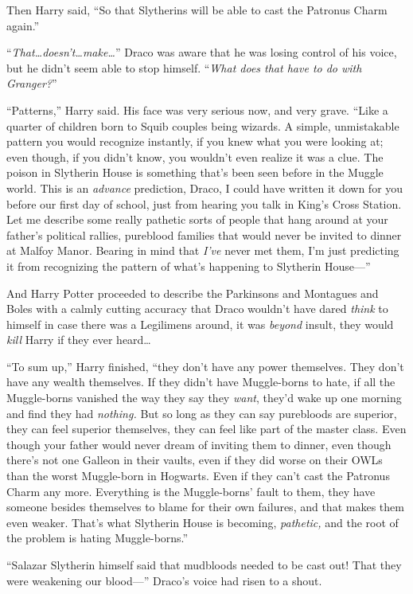 Then Harry said, “So that Slytherins will be able to cast the Patronus Charm again.”

“\emph{That…doesn’t…make…}” Draco was aware that he was losing control of his voice, but he didn’t seem able to stop himself. “\emph{What does that have to do with Granger?}”

“Patterns,” Harry said. His face was very serious now, and very grave. “Like a quarter of children born to Squib couples being wizards. A simple, unmistakable pattern you would recognize instantly, if you knew what you were looking at; even though, if you didn’t know, you wouldn’t even realize it was a clue. The poison in Slytherin House is something that’s been seen before in the Muggle world. This is an \emph{advance} prediction, Draco, I could have written it down for you before our first day of school, just from hearing you talk in King’s Cross Station. Let me describe some really pathetic sorts of people that hang around at your father’s political rallies, pureblood families that would never be invited to dinner at Malfoy Manor. Bearing in mind that \emph{I’ve} never met them, I’m just predicting it from recognizing the pattern of what’s happening to Slytherin House—”

And Harry Potter proceeded to describe the Parkinsons and Montagues and Boles with a calmly cutting accuracy that Draco wouldn’t have dared \emph{think} to himself in case there was a Legilimens around, it was \emph{beyond} insult, they would \emph{kill} Harry if they ever heard…

“To sum up,” Harry finished, “they don’t have any power themselves. They don’t have any wealth themselves. If they didn’t have Muggle-borns to hate, if all the Muggle-borns vanished the way they say they \emph{want}, they’d wake up one morning and find they had \emph{nothing.} But so long as they can say purebloods are superior, they can feel superior themselves, they can feel like part of the master class. Even though your father would never dream of inviting them to dinner, even though there’s not one Galleon in their vaults, even if they did worse on their OWLs than the worst Muggle-born in Hogwarts. Even if they can’t cast the Patronus Charm any more. Everything is the Muggle-borns’ fault to them, they have someone besides themselves to blame for their own failures, and that makes them even weaker. That’s what Slytherin House is becoming, \emph{pathetic,} and the root of the problem is hating Muggle-borns.”

“Salazar Slytherin himself said that mudbloods needed to be cast out! That they were weakening our blood—” Draco’s voice had risen to a shout.

